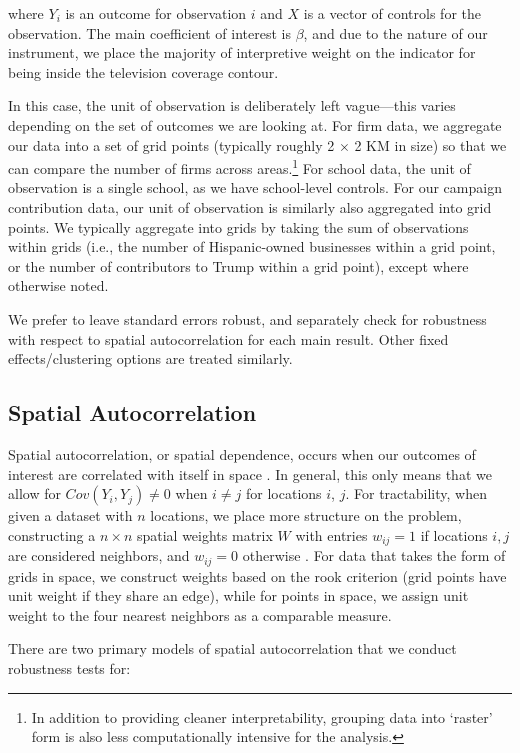 \documentclass[11pt]{article}
\begin{document}
where $Y_i$ is an outcome for observation $i$ and $X$ is a vector of controls for the observation. The main coefficient of interest is $\beta$, and due to the nature of our instrument, we place the majority of interpretive weight on the indicator for being inside the television coverage contour. 

In this case, the unit of observation is deliberately left vague---this varies depending on the set of outcomes we are looking at. For firm data, we aggregate our data into a set of grid points (typically roughly 2 $\times$ 2 KM in size) so that we can compare the number of firms across areas.\footnote{ In addition to providing cleaner interpretability, grouping data into `raster' form is also less computationally intensive for the analysis.} For school data, the unit of observation is a single school, as we have school-level controls. For our campaign contribution data, our unit of observation is similarly also aggregated into grid points. We typically aggregate into grids by taking the sum of observations within grids (i.e., the number of Hispanic-owned businesses within a grid point, or the number of contributors to Trump within a grid point), except where otherwise noted.

We prefer to leave standard errors robust, and separately check for robustness with respect to spatial autocorrelation for each main result. Other fixed effects/clustering options are treated similarly.

\subsection{Spatial Autocorrelation}

Spatial autocorrelation, or spatial dependence, occurs when our outcomes of interest are correlated with itself in space \citep{cliff_spatial_1973}. In general, this only means that we allow for $Cov(Y_i,Y_j) \neq 0$ when $i\neq j$ for locations $i$, $j$. For tractability, when given a dataset with $n$ locations, we place more structure on the problem, constructing a $n \times n$ spatial weights matrix $W$ with entries $w_{ij} = 1$ if locations $i,j$ are considered neighbors, and $w_{ij} = 0$ otherwise \citep{anselin_spatial_1998}. For data that takes the form of grids in space, we construct weights based on the rook criterion (grid points have unit weight if they share an edge), while for points in space, we assign unit weight to the four nearest neighbors as a comparable measure.

There are two primary models of spatial autocorrelation that we conduct robustness tests for:
\end{document}
